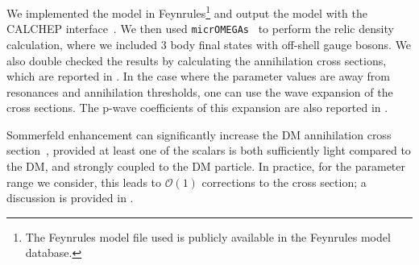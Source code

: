 We implemented the model in Feynrules\footnote{The Feynrules model file used is publicly available in the Feynrules model database.} \citep{Christensen:2008py,Alloul:2013bka} and output the model with the CALCHEP interface~\citep{Christensen:2009jx}. We then used {\tt micrOMEGAs}~\citep{Barducci:2016pcb} to perform the relic density calculation, where we included 3 body final states with off-shell gauge bosons. We also double checked the results by calculating the annihilation cross sections, which are reported in \citep{Bell:2017rgi}. In the case where the parameter values are away from resonances and annihilation thresholds, one can use the wave expansion of the cross sections. The p-wave coefficients of this expansion are also reported in \citep{Bell:2017rgi}.

Sommerfeld enhancement can significantly increase the DM annihilation
cross section~\citep{Feng:2010zp,Cassel:2009wt,Iengo:2009ni}, provided
at least one of the scalars is both sufficiently light compared to the
DM, and strongly coupled to the DM particle.  In practice, for the
parameter range we consider, this leads to $\mathcal{O}(1)$
corrections to the cross section; a discussion is provided in
\citep{Bell:2017rgi}.

